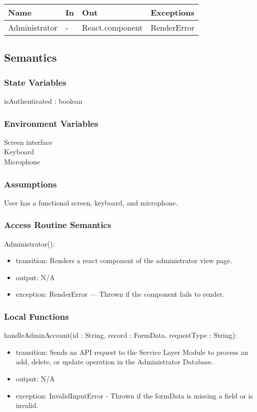\documentclass[12pt, titlepage]{article}
\begin{document}
\begin{center}
\begin{tabular}{p{3cm} p{2cm} p{4cm} p{3cm}}
\hline
\textbf{Name} & \textbf{In} & \textbf{Out} & \textbf{Exceptions} \\
\hline
Administrator & - & React.component &  RenderError\\
\hline
\end{tabular}
\end{center}

\subsection{Semantics}

\subsubsection{State Variables}
isAuthenticated : boolean

\subsubsection{Environment Variables}
Screen interface\\
Keyboard\\
Microphone

\subsubsection{Assumptions}
User has a functional screen, keyboard, and microphone.

\subsubsection{Access Routine Semantics}

\noindent Administrator():
\begin{itemize}
\item transition: Renders a react component of the administrator view page.
\item output: N/A
\item exception: RenderError — Thrown if the component fails to render.
\end{itemize}

\subsubsection{Local Functions}

\noindent handleAdminAccount(id : String, record : FormData, requestType : String):
\begin{itemize}
\item transition: Sends an API request to the Service Layer Module to process an add, delete, or update operation in the Administrator Database.
\item output: N/A
\item exception: InvalidInputError - Thrown if the formData is missing a field or is invalid.
\end{itemize} 
\end{document}
